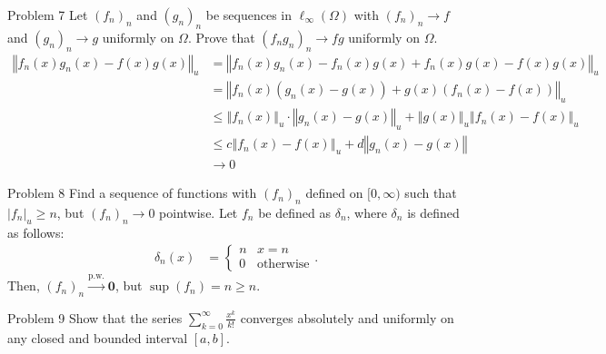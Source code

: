 \documentclass[8pt]{extarticle}
\renewcommand{\mathbf}[1]{\mathbold{#1}}
\begin{document}
  \begin{problem}{Problem 7}
    Let $(f_n)_n$ and $(g_n)_n$ be sequences in $\ell_{\infty}(\Omega)$ with $(f_n)_n \rightarrow f$ and $(g_n)_n \rightarrow g$ uniformly on $\Omega$. Prove that $(f_ng_n)_n \rightarrow fg$ uniformly on $\Omega$.
    \tcblower
    \begin{align*}
      \left\Vert f_n(x)g_n(x) - f(x)g(x)\right\Vert_u &= \left\Vert f_n(x)g_n(x) - f_n(x)g(x) + f_n(x)g(x) - f(x)g(x)\right\Vert_u\\
                                                      &= \left\Vert f_n(x)\left(g_n(x) - g(x)\right) + g(x)\left(f_n(x)-f(x)\right)\right\Vert_u\\
                                                      &\leq \left\Vert f_n(x)\right\Vert_u \cdot \left\Vert g_n(x) - g(x)\right\Vert_u + \left\Vert g(x)\right\Vert_u\left\Vert f_n(x) - f(x)\right\Vert_u \tag*{Triangle Inequality}\\
                                                      &\leq c\left\Vert f_n(x) - f(x)\right\Vert_u + d\left\Vert g_n(x) - g(x)\right\Vert \tag*{Definition of Supremum}\\
                                                      &\rightarrow 0
    \end{align*}
  \end{problem}
  \begin{problem}{Problem 8}
    Find a sequence of functions with $(f_n)_n$ defined on $[0,\infty)$ such that $\left|f_n\right|_u \geq n$, but $(f_n)_n \rightarrow 0$ pointwise.
    \tcblower
    Let $f_n$ be defined as $\delta_n$, where $\delta_n$ is defined as follows:
    \begin{align*}
      \delta_n(x) &= \begin{cases}
        n & x=n\\
        0 & \text{otherwise}
      \end{cases}.
    \end{align*}
    Then, $(f_n)_n \xrightarrow{\text{p.w.}} \mathbf{0}$, but $\sup(f_n) = n \geq n$.
  \end{problem}
  \begin{problem}{Problem 9}
    Show that the series $\sum_{k=0}^{\infty}\frac{x^k}{k!}$ converges absolutely and uniformly on any closed and bounded interval $[a,b]$.
    \tcblower
  \end{problem}
\end{document}
